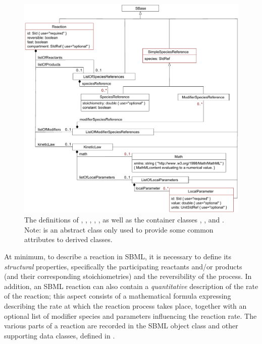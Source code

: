 \begin{figure}[b]
  \vspace*{-2.5ex}
  \centering
  \includegraphics[scale=0.74]{figs/reaction-uml-v2}
  \vspace*{-1ex}
  \caption{The definitions of \Reaction, \KineticLaw,
    \textls[-30]{\SpeciesReference}, \textls[-30]{\ModifierSpeciesReference}, \LocalParameter,
    as well as the container classes \textls[-30]{\ListOfSpeciesReferences},
    \textls[-30]{\ListOfModifierSpeciesReferences}, and \textls[-30]{\ListOfLocalParameters}.
    Note: \textls[-30]{\SimpleSpeciesReferenceUpright} is an abstract class only used
    to provide some common attributes to derived
    classes.}
  \label{fig:reaction}
\end{figure}

At minimum, to describe a reaction in SBML, it is necessary to
define its \emph{structural} properties, specifically the
participating reactants and/or products (and their corresponding
stoichiometries) and the reversibility of the process.  In
addition, an SBML reaction can also contain a \emph{quantitative}
description of the rate of the reaction; this aspect consists of a
mathematical formula expressing describing the rate at which the
reaction process takes place, together with an optional list of
modifier species and parameters influencing the reaction rate.
The various parts of a reaction are recorded in the SBML \Reaction
object class and other supporting data classes, defined in
.


